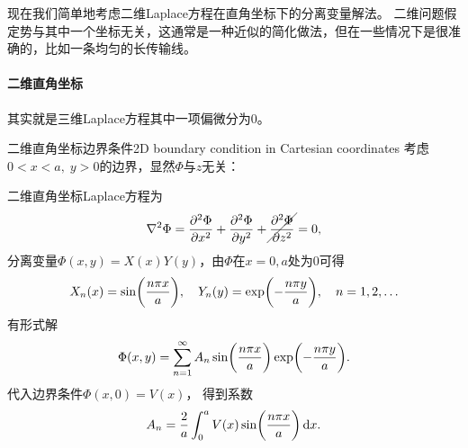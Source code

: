 现在我们简单地考虑二维Laplace方程在直角坐标下的分离变量解法。
二维问题假定势与其中一个坐标无关，这通常是一种近似的简化做法，但在一些情况下是很准确的，比如一条均匀的长传输线。

\paragraph{二维直角坐标}

其实就是三维Laplace方程其中一项偏微分为0。

\begin{example}{二维直角坐标边界条件}{2D boundary condition in Cartesian coordinates}
    考虑$0 < x < a,\;y > 0$的边界，显然$\Phi$与$z$无关：
    \begin{notecaptionblock}
        \label{fig:2D rectangular hole}
    \end{notecaptionblock}
    二维直角坐标Laplace方程为
    \[
        \laplacian\Phi = \pv[2]\Phi x + \pv[2]\Phi y + \cancel{\pv[2]\Phi z} = 0,
    \]
    分离变量$\Phi(x,y) = X(x)Y(y)$，由$\Phi$在$x = 0,a$处为0可得
    \[
        X_n(x) = \sin\biggp{\frac{n\pi x}a},\quad Y_n(y) = \exp\biggp{-\frac{n\pi y}a},\quad n = 1,2,\ldots
    \]
    有形式解
    \begin{equation}
        \Phi(x,y) = \sum_{n=1}^\infty A_n\sin\biggp{\frac{n\pi x}a}\exp\biggp{-\frac{n\pi y}a}.
    \end{equation}
    代入边界条件$\Phi(x,0) = V(x)$，
    得到系数
    \[
        A_n = \frac2a\int_0^aV(x)\sin\biggp{\frac{n\pi x}a}\d x.
    \]
\end{example}
